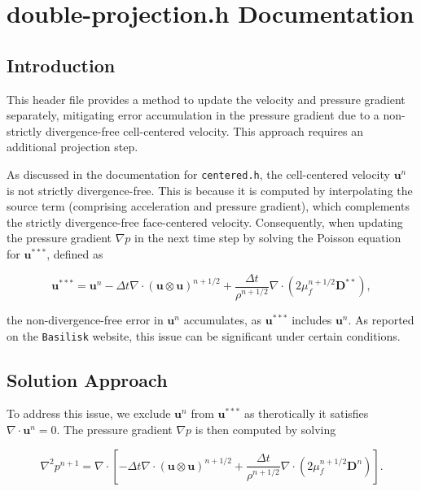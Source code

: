 \chapter{double-projection.h Documentation}
\ifsingle
\maketitle
\fi
\chaptermeta[1.0][2025-06-14]

\section{Introduction}
This header file provides a method to update the velocity and pressure gradient separately, mitigating error accumulation in the pressure gradient due to a non-strictly divergence-free cell-centered velocity. This approach requires an additional projection step.

As discussed in the documentation for \texttt{centered.h}, the cell-centered velocity $\mathbf{u}^n$ is not strictly divergence-free. This is because it is computed by interpolating the source term (comprising acceleration and pressure gradient), which complements the strictly divergence-free face-centered velocity. Consequently, when updating the pressure gradient $\nabla p$ in the next time step by solving the Poisson equation for $\mathbf{u}^{***}$, defined as

\begin{equation}
\mathbf{u}^{***} = \mathbf{u}^n - \Delta t \nabla \cdot (\mathbf{u} \otimes \mathbf{u})^{n+1/2}
+ \frac{\Delta t}{\rho^{n+1/2}} \nabla \cdot \left( 2 \mu^{n+1/2}_f \mathbf{D}^{**} \right),
\end{equation}

the non-divergence-free error in $\mathbf{u}^n$ accumulates, as $\mathbf{u}^{***}$ includes $\mathbf{u}^n$. As reported on the \texttt{Basilisk} website, this issue can be significant under certain conditions.

\section{Solution Approach}
To address this issue, we exclude $\mathbf{u}^n$ from $\mathbf{u}^{***}$ as therotically it satisfies $\nabla \cdot \mathbf{u}^n = 0$. The pressure gradient $\nabla p$ is then computed by solving

\begin{equation}
\nabla^2 p^{n+1} = \nabla \cdot \left[ -\Delta t \nabla \cdot (\mathbf{u} \otimes \mathbf{u})^{n+1/2}
+ \frac{\Delta t}{\rho^{n+1/2}} \nabla \cdot \left( 2 \mu^{n+1/2}_f \mathbf{D}^n \right) \right].
\end{equation}

